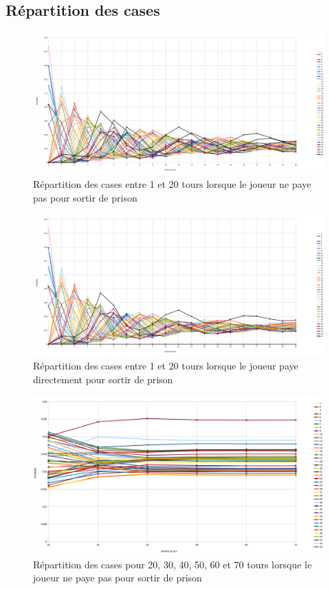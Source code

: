 \documentclass[letterpaper]{article}
\begin{document}
      \subsection{Répartition des cases}
	\begin{center}
	  \begin{figure}[h]
	    \includegraphics[scale=0.26]{./Images/GraphRepPayePasLeq20.png}
	    \caption{\label{graph_result_paye_pas} Répartition des cases entre 1 et 20 tours lorsque le joueur ne paye pas pour sortir de prison}
	  \end{figure}
	  
	  \begin{figure}[h]
	    \includegraphics[scale=0.26]{./Images/GraphRepPayeLeq20.png}
	    \caption{\label{graph_result_paye} Répartition des cases entre 1 et 20 tours lorsque le joueur paye directement pour sortir de prison}
	  \end{figure}
	  
	  \begin{figure}[h]
	    \includegraphics[scale=0.4]{./Images/GraphRepPayePas20-70.png}
	    \caption{\label{graph_all_result_paye_pas} Répartition des cases pour 20, 30, 40, 50, 60 et 70 tours lorsque le joueur ne paye pas pour sortir de prison}
	  \end{figure}
	  

\end{center}
\end{document}
